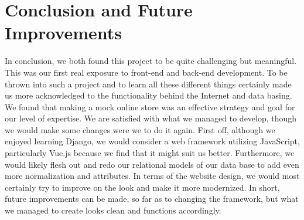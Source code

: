 \documentclass[sigconf]{acmart}
\begin{document}
\pagebreak
\section{Conclusion and Future Improvements}
In conclusion, we both found this project to be quite challenging but meaningful. This was our first real exposure to front-end and back-end development. To be thrown into such a project and to learn all these different things certainly made us more acknowledged to the functionality behind the Internet and data basing. We found that making a mock online store was an effective strategy and goal for our level of expertise. We are satisfied with what we managed to develop, though we would make some changes were we to do it again. First off, although we enjoyed learning Django, we would consider a web framework utilizing JavaScript, particularly Vue.js because we find that it might suit us better. Furthermore, we would likely flesh out and redo our relational models of our data base to add even more normalization and attributes. In terms of the website design, we would most certainly try to improve on the look and make it more modernized. In short, future improvements can be made, so far as to changing the framework, but what we managed to create looks clean and functions accordingly.



\end{document}
